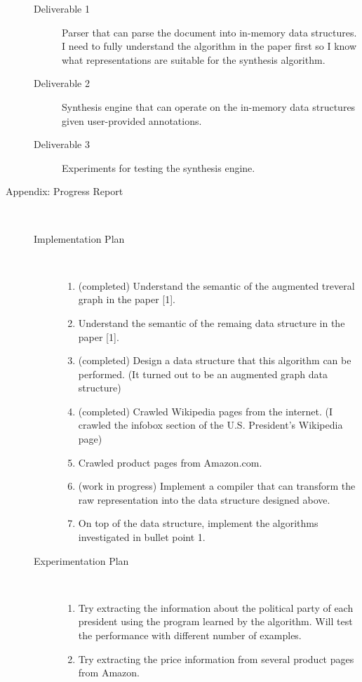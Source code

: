 \documentclass[12pt,a4paper]{article}
\begin{document}
\begin{description}
\begin{description}
        \item[Deliverable 1] Parser that can parse the document into in-memory data structures. I need to fully understand the algorithm in the paper first so I know what representations are suitable for the synthesis algorithm.
        
        \item[Deliverable 2] Synthesis engine that can operate on the in-memory data structures given user-provided annotations.

        \item[Deliverable 3] Experiments for testing the synthesis engine.
    \end{description}

\item[Appendix: Progress Report]\text{}\\


	\begin{description}
		\item[Implementation Plan]\text{}\\
		\begin{enumerate}
			\item (completed) Understand the semantic of the augmented treveral graph in the paper [1].
			\item Understand the semantic of the remaing data structure in the paper [1].
			\item (completed) Design a data structure that this algorithm can be performed. (It turned out to be an augmented graph data structure)
			\item (completed) Crawled Wikipedia pages from the internet. (I crawled the infobox section of the U.S. President's Wikipedia page) 
			\item Crawled product pages from Amazon.com.
			\item (work in progress) Implement a compiler that can transform the raw representation into the data structure designed above.
			\item On top of the data structure, implement the algorithms investigated in bullet point 1. 
		\end{enumerate}
	\item[Experimentation Plan]\text{}\\
	\begin{enumerate}
		\item Try extracting the information about the political party of each president using the program learned by the algorithm. Will test the performance with different number of examples.
		\item Try extracting the price information from several product pages from Amazon.
	\end{enumerate}
	\end{description}
\end{description}
\nocite{Le2014FlashExtractAF} 
\nocite{yaghmazadeh2018automated}


\end{document}
